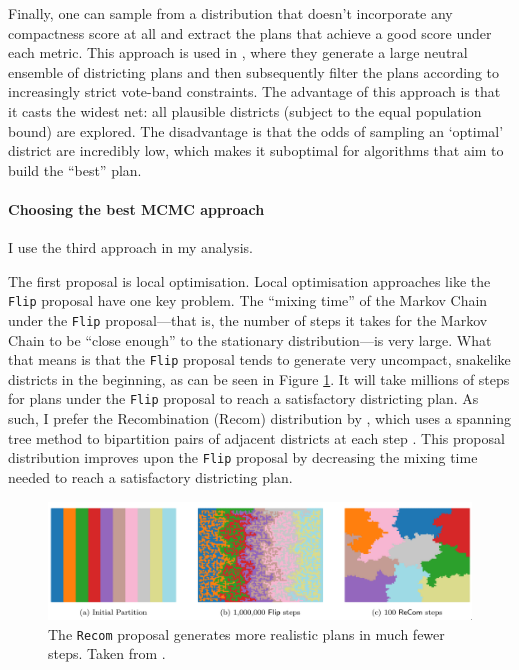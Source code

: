 \documentclass[]{article}
\let\oldparagraph\paragraph
\renewcommand{\paragraph}[1]{\oldparagraph{#1}\mbox{}}
\begin{document}
Finally, one can sample from a distribution that doesn't incorporate any
compactness score at all and extract the plans that achieve a good score
under each metric. This approach is used in \cite{ddj2019comp}, where
they generate a large neutral ensemble of districting plans and then
subsequently filter the plans according to increasingly strict vote-band
constraints. The advantage of this approach is that it casts the widest
net: all plausible districts (subject to the equal population bound) are
explored. The disadvantage is that the odds of sampling an `optimal'
district are incredibly low, which makes it suboptimal for algorithms
that aim to build the ``best'' plan.

\hypertarget{choosing-the-best-mcmc-approach}{%
\paragraph{Choosing the best MCMC
approach}\label{choosing-the-best-mcmc-approach}}

I use the third approach in my analysis.

The first proposal is local optimisation. Local optimisation approaches
like the \texttt{Flip} proposal have one key problem. The ``mixing
time'' of the Markov Chain under the \texttt{Flip} proposal---that is,
the number of steps it takes for the Markov Chain to be ``close enough''
to the stationary distribution---is very large. What that means is that
the \texttt{Flip} proposal tends to generate very uncompact, snakelike
districts in the beginning, as can be seen in Figure
\ref{recom_vs_flip}. It will take millions of steps for plans under the
\texttt{Flip} proposal to reach a satisfactory districting plan. As
such, I prefer the Recombination (Recom) distribution by
\citeauthor{ddj2019recom}, which uses a spanning tree method to
bipartition pairs of adjacent districts at each step
\citep{ddj2019comp}. This proposal distribution improves upon the
\texttt{Flip} proposal by decreasing the mixing time needed to reach a
satisfactory districting plan.

\begin{figure}
\centering
\includegraphics{img/recom_vs_flip.png}
\caption{\label{recom_vs_flip} The \texttt{Recom} proposal generates
more realistic plans in much fewer steps. Taken from
\cite{ddj2019recom}.}
\end{figure}
\end{document}
